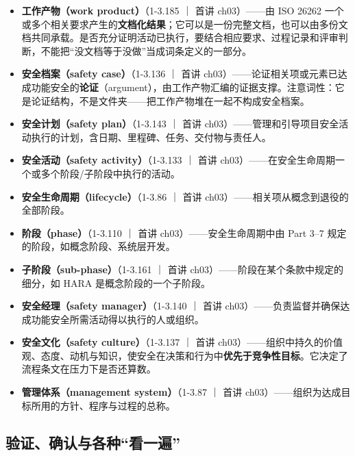 \begin{itemize}
\item \textbf{工作产物（work product）}（1-3.185 ｜ 首讲 ch03）——由 ISO 26262 一个或多个相关要求产生的\textbf{文档化结果}；它可以是一份完整文档，也可以由多份文档共同承载。是否充分证明活动已执行，要结合相应要求、过程记录和评审判断，不能把“没文档等于没做”当成词条定义的一部分。
\item \textbf{安全档案（safety case）}（1-3.136 ｜ 首讲 ch03）——论证相关项或元素已达成功能安全的\textbf{论证}（argument），由工作产物汇编的证据支撑。注意词性：它是论证结构，不是文件夹——把工作产物堆在一起不构成安全档案。
\item \textbf{安全计划（safety plan）}（1-3.143 ｜ 首讲 ch03）——管理和引导项目安全活动执行的计划，含日期、里程碑、任务、交付物与责任人。
\item \textbf{安全活动（safety activity）}（1-3.133 ｜ 首讲 ch03）——在安全生命周期一个或多个阶段/子阶段中执行的活动。
\item \textbf{安全生命周期（lifecycle）}（1-3.86 ｜ 首讲 ch03）——相关项从概念到退役的全部阶段。
\item \textbf{阶段（phase）}（1-3.110 ｜ 首讲 ch03）——安全生命周期中由 Part 3–7 规定的阶段，如概念阶段、系统层开发。
\item \textbf{子阶段（sub-phase）}（1-3.161 ｜ 首讲 ch03）——阶段在某个条款中规定的细分，如 HARA 是概念阶段的一个子阶段。
\item \textbf{安全经理（safety manager）}（1-3.140 ｜ 首讲 ch03）——负责监督并确保达成功能安全所需活动得以执行的人或组织。
\item \textbf{安全文化（safety culture）}（1-3.137 ｜ 首讲 ch03）——组织中持久的价值观、态度、动机与知识，使安全在决策和行为中\textbf{优先于竞争性目标}。它决定了流程条文在压力下是否还算数。
\item \textbf{管理体系（management system）}（1-3.87 ｜ 首讲 ch03）——组织为达成目标所用的方针、程序与过程的总称。
\end{itemize}

\subsection{验证、确认与各种“看一遍”}

